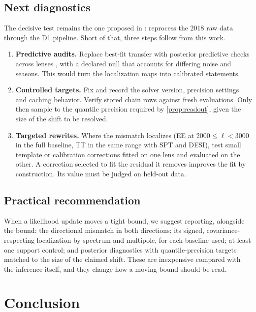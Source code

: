 \documentclass[11pt]{article}
\theoremstyle{remark}
\numberwithin{equation}{section}
\begin{document}
\subsection{Next diagnostics}
The decisive test remains the one proposed in \cite{arxiv2601_16277}: reprocess the 2018 raw data through the D1 pipeline. Short of that, three steps follow from this work.
\begin{enumerate}[leftmargin=*, itemsep=2pt]
  \item \textbf{Predictive audits.} Replace best-fit transfer with posterior predictive checks across lenses \cite{gelman_meng_stern1996_ppc}, with a declared null that accounts for differing noise and seasons. This would turn the localization maps into calibrated statements.
  \item \textbf{Controlled targets.} Fix and record the solver version, precision settings and caching behavior. Verify stored chain rows against fresh evaluations. Only then sample to the quantile precision required by \cref{prop:readout}, given the size of the shift to be resolved.
  \item \textbf{Targeted rewrites.} Where the mismatch localizes (EE at $2000\le\ell<3000$ in the full baseline, TT in the same range with SPT and DESI), test small template or calibration corrections fitted on one lens and evaluated on the other. A correction selected to fit the residual it removes improves the fit by construction. Its value must be judged on held-out data.
\end{enumerate}

\subsection{Practical recommendation}
When a likelihood update moves a tight bound, we suggest reporting, alongside the bound: the directional mismatch in both directions; its signed, covariance-respecting localization by spectrum and multipole, for each baseline used; at least one support control; and posterior diagnostics with quantile-precision targets matched to the size of the claimed shift. These are inexpensive compared with the inference itself, and they change how a moving bound should be read.
 \section{Conclusion}
\label{sec:conclusion}
\end{document}
